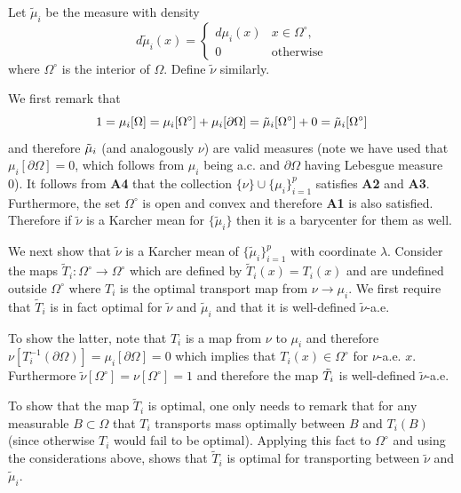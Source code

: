 \documentclass[nohyperref]{article}
\theoremstyle{definition}
\begin{document}
Let $\tilde{\mu}_i$ be the measure with density $$d\tilde{\mu}_i(x) = \begin{cases}
    d\mu_i(x) & x \in \Omega^\circ, \\
    0 & \text{otherwise}
\end{cases}$$
where $\Omega^{\circ}$ is the interior of $\Omega$.  Define $\tilde{\nu}$ similarly.

We first remark that 
$$1 = \mu_i[\Omega] = \mu_i[\Omega^\circ] + \mu_i[\partial\Omega] = \Tilde{\mu}_i[\Omega^\circ] + 0 = \Tilde{\mu}_i[\Omega^\circ]$$
and therefore $\Tilde{\mu}_i$ (and analogously $\nu$) are valid measures (note we have used that $\mu_{i}[\partial \Omega]=0$, which follows from $\mu_{i}$ being a.c. and $\partial \Omega$ having Lebesgue measure 0).  It follows from \textbf{A4} that the collection $\{\nu\} \cup \{\mu_i\}_{i=1}^p$ satisfies \textbf{A2} and \textbf{A3}. Furthermore, the set $\Omega^\circ$ is open and convex and therefore \textbf{A1} is also satisfied. Therefore if $\tilde{\nu}$ is a Karcher mean for $\{\tilde{\mu}_i\}$ then it is a barycenter for them as well.

We next show that $\tilde{\nu}$ is a Karcher mean of $\{\tilde{\mu}_i\}_{i=1}^p$ with coordinate $\lambda$. Consider the maps $\tilde{T}_i:\Omega^\circ \rightarrow \Omega^\circ$ which are defined by $\tilde{T}_i(x) = T_i(x)$ and are undefined outside $\Omega^\circ$
where $T_i$ is the optimal transport map from $\nu \rightarrow \mu_i$. We first require that $\tilde{T}_i$ is in fact optimal for $\tilde{\nu}$ and $\tilde{\mu}_i$ and that it is well-defined $\tilde{\nu}$-a.e. 

To show the latter, note that $T_i$ is a map from $\nu$ to $\mu_i$ and therefore $\nu[T_i^{-1}(\partial \Omega)] = \mu_i[\partial \Omega] = 0$ which implies that $T_i(x) \in \Omega^\circ$ for $\nu$-a.e. $x$. Furthermore $\tilde{\nu}[\Omega^\circ] = \nu[\Omega^\circ] = 1$ and therefore the map $\Tilde{T}_i$ is well-defined $\tilde{\nu}$-a.e.

To show that the map $\tilde{T}_i$ is optimal, one only needs to remark that for any measurable $B \subset \Omega$ that $T_i$ transports mass optimally between $B$ and $T_i(B)$ (since otherwise $T_i$ would fail to be optimal). Applying this fact to $\Omega^\circ$ and using the considerations above, shows that $\tilde{T}_i$ is optimal for transporting between $\tilde{\nu}$ and $\tilde{\mu}_i$.
\end{document}
